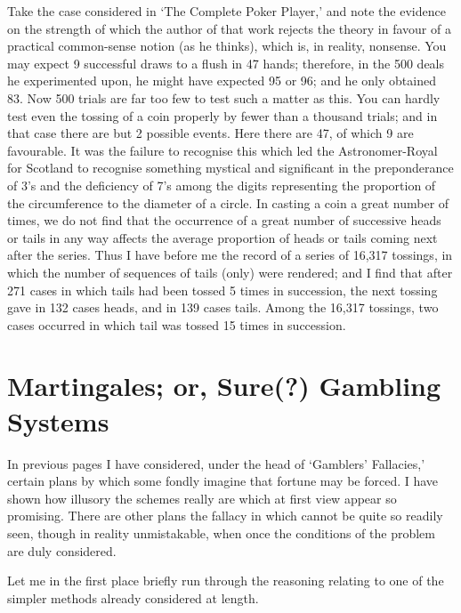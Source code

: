 \documentclass[letterpaper,12pt,oneside,openany]{memoir}
\begin{document}
Take the case considered in `The Complete Poker
Player,' and note the evidence on the strength of which
the author of that work rejects the theory in favour of
a practical common-sense notion (as he thinks), which
is, in reality, nonsense. You may expect 9 successful
draws to a flush in 47 hands; therefore, in the 500 deals
he experimented upon, he might have expected 95 or 96;
and he only obtained 83. Now 500 trials are far too
few to test such a matter as this. You can hardly test
even the tossing of a coin properly by fewer than a
thousand trials; and in that case there are but 2 possible
events. Here there are 47, of which 9 are favourable.
It was the failure to recognise this which led the
Astronomer-Royal for Scotland to recognise something
mystical and significant in the preponderance of 3's
and the deficiency of 7's among the digits representing
the proportion of the circumference to the diameter of
a circle. In casting a coin a great number of times, we
do not find that the occurrence of a great number of
successive heads or tails in any way affects the average
proportion of heads or tails coming next after the
series. Thus I have before me the record of a series of
16,317 tossings, in which the number of sequences of
tails (only) were rendered; and I find that after 271
cases in which tails had been tossed 5 times in succession,
the next tossing gave in 132 cases heads, and
in 139 cases tails. Among the 16,317 tossings, two
cases occurred in which tail was tossed 15 times in
succession.

\chapter[Martingales][Martingales]{Martingales; or, Sure(?) Gambling Systems}

In previous pages I have considered, under the head of
`Gamblers' Fallacies,' certain plans by which some
fondly imagine that fortune may be forced. I have
shown how illusory the schemes really are which at
first view appear so promising. There are other plans
the fallacy in which cannot be quite so readily seen,
though in reality unmistakable, when once the conditions
of the problem are duly considered.

Let me in the first place briefly run through the
reasoning relating to one of the simpler methods already
considered at length.
\end{document}

